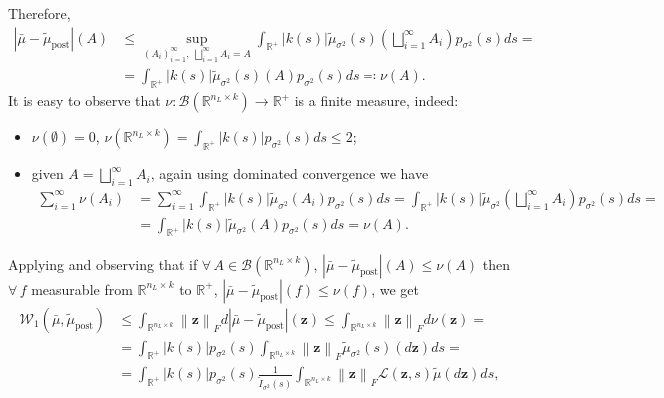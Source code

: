 \documentclass[a4paper, 11pt, reqno]{amsart}
\theoremstyle{plain}
\theoremstyle{remark}
\theoremstyle{definition}
\newcommand{\wass}[3][2]{\mathcal{W}_{#1}\left(#2, #3\right)}
\newcommand{\real}{\mathbb{R}}
\newcommand{\borel}[1]{\mathcal{B}\left(#1\right)}
\newcommand{\norm}[1]{\left\lVert#1\right\rVert}
\let\oldforall\forall
\renewcommand{\forall}{\oldforall\,}
\begin{document}
Therefore,
\begin{equation*}
	\begin{aligned}
		|\bar{\mu} - \widetilde{\mu}_\mathrm{post}|(A) & \leq \sup_{\left(A_i\right)_{i = 1}^{\infty}, \ \bigsqcup_{i = 1}^{\infty} A_i = A} \int_{\real^+} |k(s)| \widetilde{\mu}_{\sigma^2}(s)\left(\bigsqcup_{i = 1}^\infty A_i\right) p_{\sigma^2}(s) ds = \\
		& = \int_{\real^+} |k(s)| \widetilde{\mu}_{\sigma^2}(s)(A) p_{\sigma^2}(s) ds \eqcolon \nu(A).
	\end{aligned}
\end{equation*}
It is easy to observe that $\nu: \borel{\real^{n_L \times k}} \to \real^+$ is a finite measure, indeed:
\begin{itemize}
	\item[-] $\nu(\emptyset) = 0$, $\nu(\real^{n_L \times k}) = \int_{\real^+} |k(s)| p_{\sigma^2}(s) ds \leq 2$;
	\item[-] given $A = \bigsqcup_{i = 1}^{\infty} A_i$, again using dominated convergence we have
		\begin{equation*}
			\begin{aligned}
				\sum_{i = 1}^{\infty} \nu(A_i) & = \sum_{i = 1}^{\infty} \int_{\real^+} |k(s)| \widetilde{\mu}_{\sigma^2}(A_i) p_{\sigma^2}(s) ds = \int_{\real^+} |k(s)| \widetilde{\mu}_{\sigma^2}\left(\bigsqcup_{i = 1}^{\infty} A_i\right) p_{\sigma^2}(s) ds = \\
				& = \int_{\real^+} |k(s)| \widetilde{\mu}_{\sigma^2}(A) p_{\sigma^2}(s) ds = \nu(A).
			\end{aligned}
		\end{equation*}
\end{itemize}
Applying  and observing that if $\forall A \in \borel{\real^{n_L \times k}}$, $|\bar{\mu} - \widetilde{\mu}_\mathrm{post}|(A) \leq \nu(A)$ then $\forall f$ measurable from $\real^{n_L \times k}$ to $\real^+$, $|\bar{\mu} - \widetilde{\mu}_\mathrm{post}|(f) \leq \nu(f)$, we get
\begin{align} 
	\wass[1]{\bar{\mu}}{\widetilde{\mu}_{\mathrm{post}}} & \leq \int_{\real^{n_L \times k}} \norm{\bm{z}}_F d |\bar{\mu} - \widetilde{\mu}_\mathrm{post}|(\bm{z}) \leq \int_{\real^{n_L \times k}} \norm{\bm{z}}_F d \nu(\bm{z}) = \nonumber \\
	& = \int_{\real^+} |k(s)| p_{\sigma^2}(s) \int_{\real^{n_L \times k}} \norm{\bm{z}}_F \widetilde{\mu}_{\sigma^2}(s)(d \bm{z}) ds = \nonumber \\
	& = \int_{\real^+} |k(s)| p_{\sigma^2}(s) \frac{1}{\widetilde{\mathit{I}}_{\sigma^2}(s)} \int_{\real^{n_L \times k}} \norm{\bm{z}}_F \mathcal{L}(\bm{z}, s) \widetilde{\mu}(d\bm{z}) ds, \label{eq:wassbound1}
\end{align}
\end{document}

